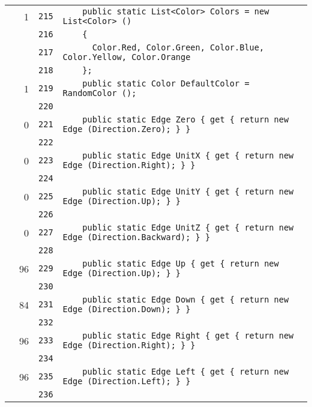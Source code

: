 \documentclass[a4paper,10pt]{article}
\begin{document}
\begin{longtable}[l]{lrrl}
\cellcolor{green} & 1 & \verb~215~ & \verb~    public static List<Color> Colors = new List<Color> ()~\\
\cellcolor{gray} &  & \verb~216~ & \verb~    {~\\
\cellcolor{gray} &  & \verb~217~ & \verb~      Color.Red, Color.Green, Color.Blue, Color.Yellow, Color.Orange~\\
\cellcolor{gray} &  & \verb~218~ & \verb~    };~\\
\cellcolor{green} & 1 & \verb~219~ & \verb~    public static Color DefaultColor = RandomColor ();~\\
\cellcolor{gray} &  & \verb~220~ & \verb~~\\
\cellcolor{red} & 0 & \verb~221~ & \verb~    public static Edge Zero { get { return new Edge (Direction.Zero); } }~\\
\cellcolor{gray} &  & \verb~222~ & \verb~~\\
\cellcolor{red} & 0 & \verb~223~ & \verb~    public static Edge UnitX { get { return new Edge (Direction.Right); } }~\\
\cellcolor{gray} &  & \verb~224~ & \verb~~\\
\cellcolor{red} & 0 & \verb~225~ & \verb~    public static Edge UnitY { get { return new Edge (Direction.Up); } }~\\
\cellcolor{gray} &  & \verb~226~ & \verb~~\\
\cellcolor{red} & 0 & \verb~227~ & \verb~    public static Edge UnitZ { get { return new Edge (Direction.Backward); } }~\\
\cellcolor{gray} &  & \verb~228~ & \verb~~\\
\cellcolor{green} & 96 & \verb~229~ & \verb~    public static Edge Up { get { return new Edge (Direction.Up); } }~\\
\cellcolor{gray} &  & \verb~230~ & \verb~~\\
\cellcolor{green} & 84 & \verb~231~ & \verb~    public static Edge Down { get { return new Edge (Direction.Down); } }~\\
\cellcolor{gray} &  & \verb~232~ & \verb~~\\
\cellcolor{green} & 96 & \verb~233~ & \verb~    public static Edge Right { get { return new Edge (Direction.Right); } }~\\
\cellcolor{gray} &  & \verb~234~ & \verb~~\\
\cellcolor{green} & 96 & \verb~235~ & \verb~    public static Edge Left { get { return new Edge (Direction.Left); } }~\\
\cellcolor{gray} &  & \verb~236~ & \verb~~\\

\end{longtable}
\end{document}
